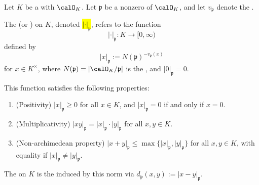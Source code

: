 \begin{definition}\label{definition:p_adic_norm_for_a_prime_of_a_number_field}
    Let $K$ be a  with  $\calO_K$. Let $\mathfrak{p}$ be a nonzero  of $\calO_K$, and let $v_\mathfrak{p}$ denote the .

    The  (or ) on $K$, denoted \hl{$|\cdot|_\mathfrak{p}$}, refers to the function
    $$
        |\cdot|_\mathfrak{p} : K \to [0, \infty)
    $$
    defined by
    $$
        |x|_\mathfrak{p} := N(\mathfrak{p})^{-v_\mathfrak{p}(x)}
    $$
    for $x \in K^\times$, where $N(\mathfrak{p}) = |\calO_K/\mathfrak{p}|$ is the , and $|0|_\mathfrak{p} = 0$.

    This function satisfies the following properties:
    \begin{enumerate}
        \item (Positivity) $|x|_\mathfrak{p} \geq 0$ for all $x \in K$, and $|x|_\mathfrak{p} = 0$ if and only if $x = 0$.
        \item (Multiplicativity) $|xy|_\mathfrak{p} = |x|_\mathfrak{p} \cdot |y|_\mathfrak{p}$ for all $x, y \in K$.
        \item (Non-archimedean property) $|x + y|_\mathfrak{p} \leq \max\{|x|_\mathfrak{p}, |y|_\mathfrak{p}\}$ for all $x, y \in K$, with equality if $|x|_\mathfrak{p} \neq |y|_\mathfrak{p}$.
    \end{enumerate}

    The  on $K$ is the  induced by this norm via $d_\mathfrak{p}(x, y) := |x - y|_\mathfrak{p}$.
\end{definition}
